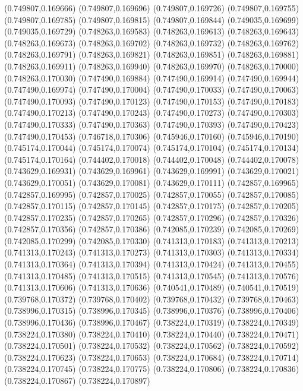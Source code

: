 (0.749807,0.169666)
(0.749807,0.169696)
(0.749807,0.169726)
(0.749807,0.169755)
(0.749807,0.169785)
(0.749807,0.169815)
(0.749807,0.169844)
(0.749035,0.169699)
(0.749035,0.169729)
(0.748263,0.169583)
(0.748263,0.169613)
(0.748263,0.169643)
(0.748263,0.169673)
(0.748263,0.169702)
(0.748263,0.169732)
(0.748263,0.169762)
(0.748263,0.169791)
(0.748263,0.169821)
(0.748263,0.169851)
(0.748263,0.169881)
(0.748263,0.169911)
(0.748263,0.169940)
(0.748263,0.169970)
(0.748263,0.170000)
(0.748263,0.170030)
(0.747490,0.169884)
(0.747490,0.169914)
(0.747490,0.169944)
(0.747490,0.169974)
(0.747490,0.170004)
(0.747490,0.170033)
(0.747490,0.170063)
(0.747490,0.170093)
(0.747490,0.170123)
(0.747490,0.170153)
(0.747490,0.170183)
(0.747490,0.170213)
(0.747490,0.170243)
(0.747490,0.170273)
(0.747490,0.170303)
(0.747490,0.170333)
(0.747490,0.170363)
(0.747490,0.170393)
(0.747490,0.170423)
(0.747490,0.170453)
(0.746718,0.170306)
(0.745946,0.170160)
(0.745946,0.170190)
(0.745174,0.170044)
(0.745174,0.170074)
(0.745174,0.170104)
(0.745174,0.170134)
(0.745174,0.170164)
(0.744402,0.170018)
(0.744402,0.170048)
(0.744402,0.170078)
(0.743629,0.169931)
(0.743629,0.169961)
(0.743629,0.169991)
(0.743629,0.170021)
(0.743629,0.170051)
(0.743629,0.170081)
(0.743629,0.170111)
(0.742857,0.169965)
(0.742857,0.169995)
(0.742857,0.170025)
(0.742857,0.170055)
(0.742857,0.170085)
(0.742857,0.170115)
(0.742857,0.170145)
(0.742857,0.170175)
(0.742857,0.170205)
(0.742857,0.170235)
(0.742857,0.170265)
(0.742857,0.170296)
(0.742857,0.170326)
(0.742857,0.170356)
(0.742857,0.170386)
(0.742085,0.170239)
(0.742085,0.170269)
(0.742085,0.170299)
(0.742085,0.170330)
(0.741313,0.170183)
(0.741313,0.170213)
(0.741313,0.170243)
(0.741313,0.170273)
(0.741313,0.170303)
(0.741313,0.170334)
(0.741313,0.170364)
(0.741313,0.170394)
(0.741313,0.170424)
(0.741313,0.170455)
(0.741313,0.170485)
(0.741313,0.170515)
(0.741313,0.170545)
(0.741313,0.170576)
(0.741313,0.170606)
(0.741313,0.170636)
(0.740541,0.170489)
(0.740541,0.170519)
(0.739768,0.170372)
(0.739768,0.170402)
(0.739768,0.170432)
(0.739768,0.170463)
(0.738996,0.170315)
(0.738996,0.170345)
(0.738996,0.170376)
(0.738996,0.170406)
(0.738996,0.170436)
(0.738996,0.170467)
(0.738224,0.170319)
(0.738224,0.170349)
(0.738224,0.170380)
(0.738224,0.170410)
(0.738224,0.170440)
(0.738224,0.170471)
(0.738224,0.170501)
(0.738224,0.170532)
(0.738224,0.170562)
(0.738224,0.170592)
(0.738224,0.170623)
(0.738224,0.170653)
(0.738224,0.170684)
(0.738224,0.170714)
(0.738224,0.170745)
(0.738224,0.170775)
(0.738224,0.170806)
(0.738224,0.170836)
(0.738224,0.170867)
(0.738224,0.170897)
